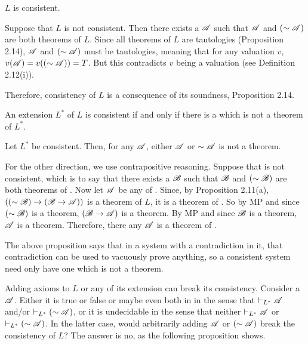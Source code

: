 \begin{proposition}
  \(L\) is consistent.

  \prf{} Suppose that \(L\) is not consistent. Then there exists a \wf{} \(\mathscr{A}\) such that \(\mathscr{A}\) and \((\sim\mathscr{A})\) are both theorems of \(L\). Since all theorems of \(L\) are tautologies (Proposition 2.14), \(\mathscr{A}\) and \((\sim\mathscr{A})\) must be tautologies, meaning that for any valuation \(v\), \(v(\mathscr{A}) = v((\sim\mathscr{A})) = T\). But this contradicts \(v\) being a valuation (see Definition 2.12(i)).

  \note{} Therefore, consistency of \(L\) is a consequence of its soundness, Proposition 2.14.
\end{proposition}

\begin{proposition}
  An extension \(L^{\ast}\) of \(L\) is consistent if and only if there is a \wf{} which is not a theorem of \(L^{\ast}\).

  \prf{} \Ra{} Let \(L^{\ast}\) be consistent. Then, for any \wf{} \(\mathscr{A}\), either \(\mathscr{A}\) or \(\sim\mathscr{A}\) is not a theorem.

  \La{} For the other direction, we use contrapositive reasoning. Suppose that \Lext{} is not consistent, which is to say that there exists a \wf{} \(\mathscr{B}\) such that \(\mathscr{B}\) and \((\sim\mathscr{B})\) are both theorems of \Lext{}. Now let \(\mathscr{A}\) be any \wf{} of \Lext{}. Since, by Proposition 2.11(a), \(((\sim\mathscr{B}) \rightarrow (\mathscr{B} \rightarrow \mathscr{A}))\) is a theorem of \(L\), it is a theorem of \Lext{}. So by MP and since \((\sim\mathscr{B})\) is a theorem, \((\mathscr{B} \rightarrow \mathscr{A})\) is a theorem. By MP and since \(\mathscr{B}\) is a theorem, \(\mathscr{A}\) is a theorem. Therefore, there any \wf{} \(\mathscr{A}\) is a theorem of \Lext.

  \note{} The above proposition says that in a system with a contradiction in it, that contradiction can be used to vacuously prove anything, so a consistent system need only have one \wf{} which is not a theorem.
\end{proposition}

Adding axioms to \(L\) or any of its extension can break its consistency. Consider a \wf{} \(\mathscr{A}\). Either it is true or false or maybe even both in \Lext{} in the sense that \(\vdash_{L^{\ast}} \mathscr{A}\) and/or \(\vdash_{L^{\ast}} (\sim\mathscr{A})\), or it is undecidable in the sense that neither \(\vdash_{L^{\ast}} \mathscr{A}\) or \(\vdash_{L^{\ast}} (\sim\mathscr{A})\). In the latter case, would arbitrarily adding \(\mathscr{A}\) or \((\sim\mathscr{A})\) break the consistency of \(L\)? The answer is no, as the following proposition shows.

